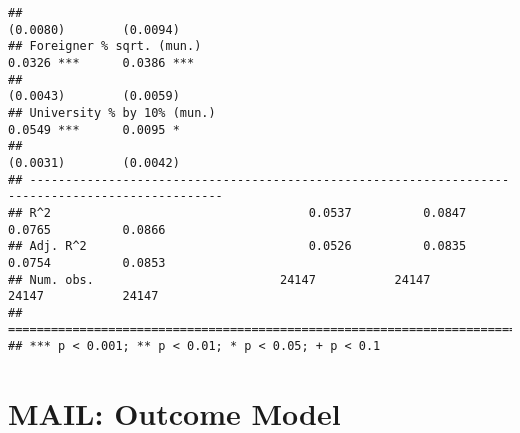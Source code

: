\documentclass[
]{article}
\begin{document}
\begin{verbatim}
##                                                                       (0.0080)        (0.0094)   
## Foreigner % sqrt. (mun.)                                               0.0326 ***      0.0386 ***
##                                                                       (0.0043)        (0.0059)   
## University % by 10% (mun.)                                             0.0549 ***      0.0095 *  
##                                                                       (0.0031)        (0.0042)   
## -------------------------------------------------------------------------------------------------
## R^2                                    0.0537          0.0847          0.0765          0.0866    
## Adj. R^2                               0.0526          0.0835          0.0754          0.0853    
## Num. obs.                          24147           24147           24147           24147         
## =================================================================================================
## *** p < 0.001; ** p < 0.01; * p < 0.05; + p < 0.1
\end{verbatim}

\hypertarget{mail-outcome-model}{%
\section{MAIL: Outcome Model}\label{mail-outcome-model}}
\end{document}
